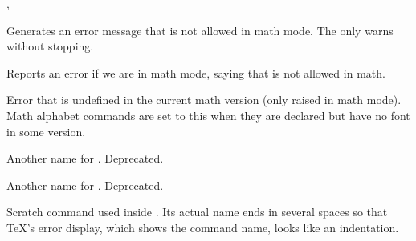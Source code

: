 \documentclass{l3in2edoc}
\begin{document}
\begin{function}[]
  {
    \@inmatherr,
    \@inmathwarn
  }
  \begin{syntax}
     
  \end{syntax}
  Generates an error message that  is not allowed in math mode.
  The  only warns without stopping.
\end{function}


\begin{function}[]
  {
    \@nomath
  }
  \begin{syntax}
     
  \end{syntax}
  Reports an error if we are in math mode, saying that 
  is not allowed in math.
\end{function}


\begin{function}[]
  {
    \no@alphabet@error
  }
  \begin{syntax}
     
  \end{syntax}
  Error that  is undefined in the current math
  version (only raised in math mode). Math alphabet commands are set
  to this when they are declared but have no font in some version.
\end{function}







\begin{function}
  {
    \@warning
  }
  \begin{syntax}
     
  \end{syntax}
  Another name for . Deprecated.

\end{function}


\begin{function}
  {
    \@@warning
  }
  \begin{syntax}
     
  \end{syntax}

  Another name for . Deprecated.
\end{function}



\begin{function}[int]
  {
    \@err@
  }
  Scratch command used inside . Its actual name
  ends in several spaces so that \TeX's error display, which shows the
  command name, looks like an indentation.
\end{function}
\end{document}
